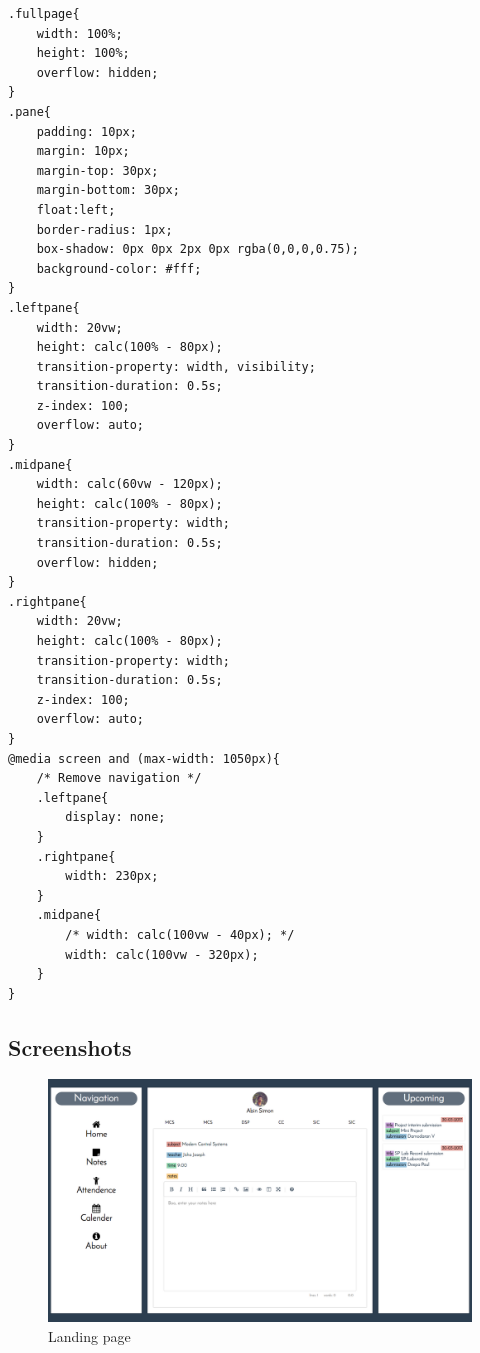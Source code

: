 \documentclass{article}
\begin{document}
\begin{lstlisting}
.fullpage{
    width: 100%;
    height: 100%;
    overflow: hidden;
}
.pane{
    padding: 10px;
    margin: 10px;
    margin-top: 30px;
    margin-bottom: 30px;
    float:left;
    border-radius: 1px;
    box-shadow: 0px 0px 2px 0px rgba(0,0,0,0.75);
    background-color: #fff;
}
.leftpane{
    width: 20vw;
    height: calc(100% - 80px);
    transition-property: width, visibility;
    transition-duration: 0.5s;
    z-index: 100;
    overflow: auto;
}
.midpane{
    width: calc(60vw - 120px);
    height: calc(100% - 80px);
    transition-property: width;
    transition-duration: 0.5s;
    overflow: hidden;
}
.rightpane{
    width: 20vw;
    height: calc(100% - 80px);
    transition-property: width;
    transition-duration: 0.5s;
    z-index: 100;
    overflow: auto;
}
@media screen and (max-width: 1050px){
    /* Remove navigation */
    .leftpane{
        display: none;
    }
    .rightpane{
        width: 230px;
    }
    .midpane{
        /* width: calc(100vw - 40px); */
        width: calc(100vw - 320px);
    }
}
\end{lstlisting}


\newpage

\subsection{Screenshots}
\vspace{1em}

\begin{figure}
  \includegraphics[width=\linewidth]{landingpage.png}
  \caption{Landing page}
\end{figure}
\end{document}
